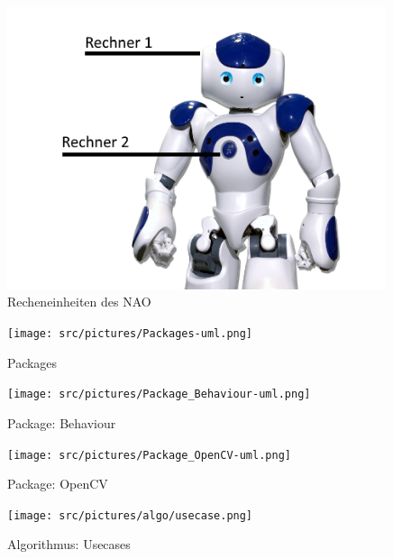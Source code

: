 \begin{appendix}
        \begin{figure}[ht]
            \centering
            \includegraphics[width=0.99\textwidth]{src/pictures/nao-computers.png}
            \caption{Recheneinheiten des NAO}
            \label{img:nao:computers}
        \end{figure}

        \cleardoubleemptypage

        \begin{figure}[ht]
            \centering
            \texttt{[image: src/pictures/Packages-uml.png]}
            \caption{Packages}
            \label{img:packages}
        \end{figure}

        \begin{figure}[ht]
            \centering
            \texttt{[image: src/pictures/Package\_Behaviour-uml.png]}
            \caption{Package: Behaviour}
            \label{img:package:behaviour}
        \end{figure}

        \begin{figure}[ht]
            \centering
            \texttt{[image: src/pictures/Package\_OpenCV-uml.png]}
            \caption{Package: OpenCV}
            \label{img:package:ocv}
        \end{figure}

        \cleardoubleemptypage

        \begin{figure}[ht]
            \centering
            \texttt{[image: src/pictures/algo/usecase.png]}
            \caption{Algorithmus: Usecases}
            \label{img:algo:usecases}
        \end{figure}


\end{appendix}
